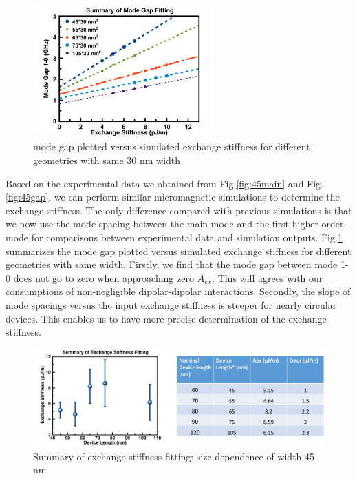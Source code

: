 \begin{figure}[!ht]
  \centering
  \includegraphics[width=0.6\textwidth]{fig/45nm/45nmsim}
   \caption{mode gap plotted versus simulated exchange stiffness for different geometries with same 30 nm width}
  \label{fig:45nmsim}
\end{figure}

Based on the experimental data we obtained from Fig.\ref{fig:45main} and Fig.\ref{fig:45gap}, we can perform similar micromagnetic simulations to determine the exchange stiffness. The only difference compared with previous simulations is that we now use the mode spacing between the main mode and the first higher order mode for comparisons between experimental data and simulation outputs. Fig.\ref{fig:45nmsim} summarizes the mode gap plotted versus simulated exchange stiffness for different geometries with same width. Firstly, we find that the mode gap between mode 1-0 does not go to zero when approaching zero $A_{ex}$. This will agrees with our consumptions of non-negligible dipolar-dipolar interactions. Secondly, the slope of mode spacings versus the input exchange stiffness is steeper for nearly circular devices. This enables us to have more precise determination of the exchange stiffness. 

\begin{figure}[!ht]
  \centering
  \includegraphics[width=1.0\textwidth]{fig/45nm/45nmex}
   \caption{Summary of exchange stiffness fitting: size dependence of width 45 nm}
  \label{fig:45nmex}
\end{figure}

